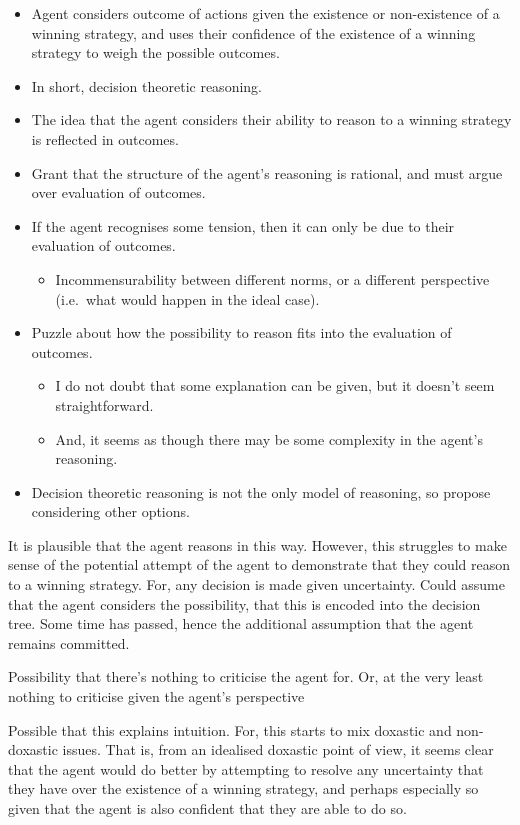 \documentclass[10pt]{article}
\newcommand{\hozlinedash}[0]{%
  \noindent\hdashrule[0.5ex][c]{\textwidth}{.1pt}{2.5pt}
}
\begin{document}
\begin{itemize}
\item Agent considers outcome of actions given the existence or non-existence of a winning strategy, and uses their confidence of the existence of a winning strategy to weigh the possible outcomes.
\item In short, decision theoretic reasoning.
\item The idea that the agent considers their ability to reason to a winning strategy is reflected in outcomes.
\item Grant that the structure of the agent's reasoning is rational, and must argue over evaluation of outcomes.
\item If the agent recognises some tension, then it can only be due to their evaluation of outcomes.
  \begin{itemize}
  \item Incommensurability between different norms, or a different perspective (i.e.\ what would happen in the ideal case).
  \end{itemize}
\item Puzzle about how the possibility to reason fits into the evaluation of outcomes.
  \begin{itemize}
  \item I do not doubt that some explanation can be given, but it doesn't seem straightforward.
  \item And, it seems as though there may be some complexity in the agent's reasoning.
  \end{itemize}
\item Decision theoretic reasoning is not the only model of reasoning, so propose considering other options.
\end{itemize}

\hozlinedash

It is plausible that the agent reasons in this way.
However, this struggles to make sense of the potential attempt of the agent to demonstrate that they could reason to a winning strategy.
For, any decision is made given uncertainty.
Could assume that the agent considers the possibility, that this is encoded into the decision tree.
Some time has passed, hence the additional assumption that the agent remains committed.

Possibility that there's nothing to criticise the agent for.
Or, at the very least nothing to criticise given the agent's perspective

\hozlinedash

Possible that this explains intuition.
For, this starts to mix doxastic and non-doxastic issues.
That is, from an idealised doxastic point of view, it seems clear that the agent would do better by attempting to resolve any uncertainty that they have over the existence of a winning strategy, and perhaps especially so given that the agent is also confident that they are able to do so.
\end{document}
